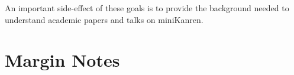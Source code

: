 \noindent
An important side-effect of these goals is to provide the background
needed to understand academic papers and talks on miniKanren.


















\section{Margin Notes}\label{sec:preface:margin-notes}

